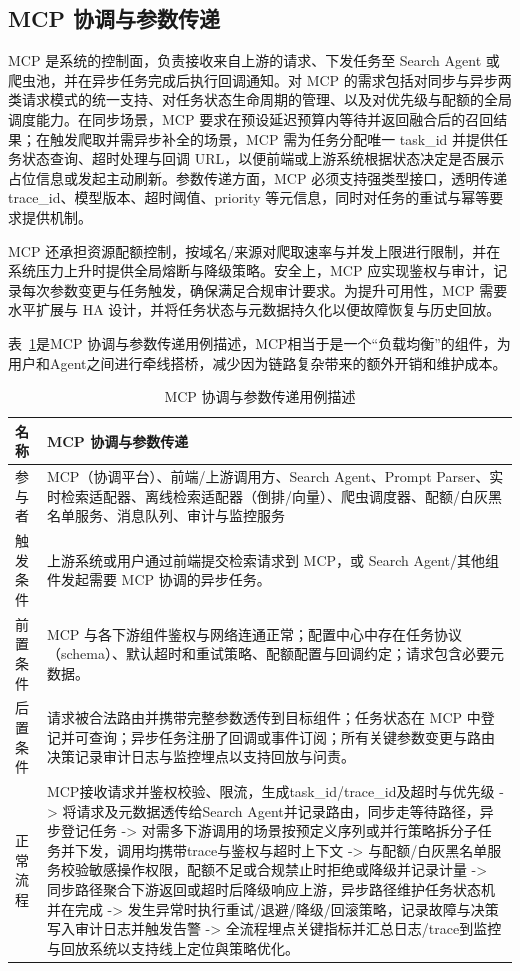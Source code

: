 \subsection{MCP 协调与参数传递} 
MCP 是系统的控制面，负责接收来自上游的请求、下发任务至 Search Agent 或爬虫池，并在异步任务完成后执行回调通知。对 MCP 的需求包括对同步与异步两类请求模式的统一支持、对任务状态生命周期的管理、以及对优先级与配额的全局调度能力。在同步场景，MCP 要求在预设延迟预算内等待并返回融合后的召回结果；在触发爬取并需异步补全的场景，MCP 需为任务分配唯一 task\_id 并提供任务状态查询、超时处理与回调 URL，以便前端或上游系统根据状态决定是否展示占位信息或发起主动刷新。参数传递方面，MCP 必须支持强类型接口，透明传递 trace\_id、模型版本、超时阈值、priority 等元信息，同时对任务的重试与幂等要求提供机制。

MCP 还承担资源配额控制，按域名/来源对爬取速率与并发上限进行限制，并在系统压力上升时提供全局熔断与降级策略。安全上，MCP 应实现鉴权与审计，记录每次参数变更与任务触发，确保满足合规审计要求。为提升可用性，MCP 需要水平扩展与 HA 设计，并将任务状态与元数据持久化以便故障恢复与历史回放。

表~\ref{tab:MCP 协调与参数传递用例描述}是MCP 协调与参数传递用例描述，MCP相当于是一个“负载均衡”的组件，为用户和Agent之间进行牵线搭桥，减少因为链路复杂带来的额外开销和维护成本。
\begin{table}[H]
\centering
\caption{MCP 协调与参数传递用例描述}
\label{tab:MCP 协调与参数传递用例描述}
{\renewcommand{\arraystretch}{1.}
\begin{tabular}{p{3cm} p{11cm}}
\hline
名称 & MCP 协调与参数传递 \\ \hline
参与者 & MCP（协调平台）、前端/上游调用方、Search Agent、Prompt Parser、实时检索适配器、离线检索适配器（倒排/向量）、爬虫调度器、配额/白灰黑名单服务、消息队列、审计与监控服务 \\ \hline
触发条件 & 上游系统或用户通过前端提交检索请求到 MCP，或 Search Agent/其他组件发起需要 MCP 协调的异步任务。 \\ \hline
前置条件 & MCP 与各下游组件鉴权与网络连通正常；配置中心中存在任务协议（schema）、默认超时和重试策略、配额配置与回调约定；请求包含必要元数据。 \\ \hline
后置条件 & 请求被合法路由并携带完整参数透传到目标组件；任务状态在 MCP 中登记并可查询；异步任务注册了回调或事件订阅；所有关键参数变更与路由决策记录审计日志与监控埋点以支持回放与问责。 \\ \hline
正常流程 &
MCP接收请求并鉴权校验、限流，生成task\_id/trace\_id及超时与优先级 -> 将请求及元数据透传给Search Agent并记录路由，同步走等待路径，异步登记任务 -> 对需多下游调用的场景按预定义序列或并行策略拆分子任务并下发，调用均携带trace与鉴权与超时上下文 -> 与配额/白灰黑名单服务校验敏感操作权限，配额不足或合规禁止时拒绝或降级并记录计量 -> 同步路径聚合下游返回或超时后降级响应上游，异步路径维护任务状态机并在完成 -> 发生异常时执行重试/退避/降级/回滚策略，记录故障与决策写入审计日志并触发告警 -> 全流程埋点关键指标并汇总日志/trace到监控与回放系统以支持线上定位與策略优化。\\
\hline
\end{tabular}
}
\end{table}

